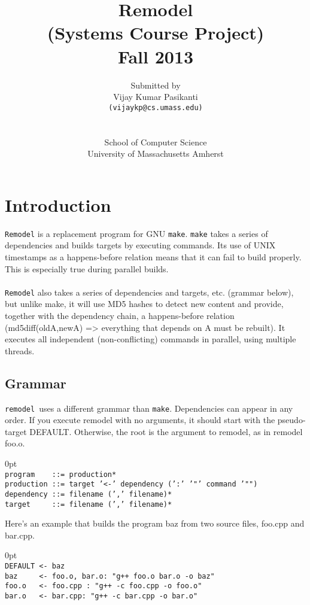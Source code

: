 \documentclass[12pt,letterpaper,titlepage, one-sided]{article}
\title{Remodel\\
(Systems Course Project)\\
Fall 2013}
\author{Submitted by\\
Vijay Kumar Pasikanti\\
\texttt{(vijaykp@cs.umass.edu)}\\
\\
\\
School of Computer Science\\
University of Massachusetts Amherst
}
\begin{document}
\newcommand{\remodel}{\texttt{remodel }}
\newcommand{\shellcmd}[1]{\\\indent\indent\texttt{#1}}
\newcommand{\shellcmds}[1]{\\\indent\texttt{#1}}
\maketitle
\tableofcontents
\newpage
\section{Introduction}
  \texttt{Remodel} is a replacement program for GNU \texttt{make}. \texttt{make} takes a series of dependencies and builds targets by executing commands. Its use of UNIX timestamps as a happens-before relation means that it can fail to build properly. This is especially true during parallel builds. \\ \\
  \texttt{Remodel} also takes a series of dependencies and targets, etc. (grammar below), but unlike make, it will use MD5 hashes to detect new content and provide, together with the dependency chain, a happens-before relation (md5diff(oldA,newA) => everything that depends on A must be rebuilt). It executes all independent (non-conflicting) commands in parallel, using multiple threads. 
  
	\subsection{Grammar}
	\remodel uses a different grammar than \texttt{make}. Dependencies can appear in any order. If you execute remodel with no arguments, it should start with the pseudo-target DEFAULT. Otherwise, the root is the argument to remodel, as in remodel foo.o. 
	\begin{adjustwidth}{.6in} {0pt}
	\texttt{\\
    program \ \ \ ::= production*\\
    production ::= target '<-' dependency (':' '"' command '"")\\
    dependency ::= filename (',' filename)*\\
    target\ \ \ \ \ ::= filename (',' filename)*\\
    }
	\end{adjustwidth}
	Here's an example that builds the program baz from two source files, foo.cpp and bar.cpp. 
	\begin{adjustwidth}{.6in} {0pt}
	\texttt{\\
    DEFAULT <- baz\\
    baz\ \ \ \ \ <- foo.o, bar.o: "g++ foo.o bar.o -o baz"\\
    foo.o  \ \ <- foo.cpp : "g++ -c foo.cpp -o foo.o"\\
    bar.o \ \ <- bar.cpp: "g++ -c bar.cpp -o bar.o"\\
 	}
	\end{adjustwidth}
\end{document}
